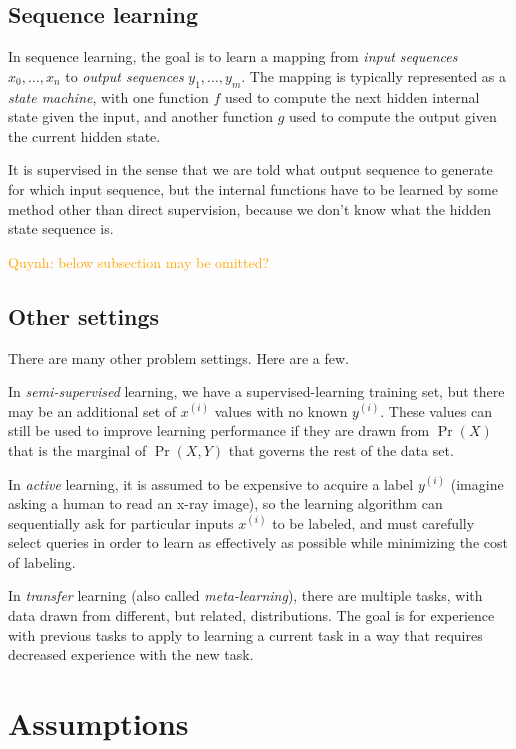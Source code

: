 \documentclass[11pt]{article}
\newcommand\ex[2]{#1^{(#2)}}
\newcommand{\qn}[1]{\textcolor{orange}{Quynh: #1}}
\begin{document}
\subsection{Sequence learning}

In sequence learning, the goal is to learn a mapping from {\em input
  sequences} $x_0, \ldots, x_n$ to {\em output sequences} $y_1,
\ldots, y_m$.  The mapping is typically represented as a {\em state
  machine}, with one function $f$ used to compute the next hidden
internal state given the input, and another function $g$ used to
compute the output given the current hidden state.  

It is supervised in the sense that we are told what output sequence to
generate for which input sequence, but the internal functions have to
be learned by some method other than direct supervision, because we
don't know what the hidden state sequence is.


\qn{below subsection may be omitted?}
\subsection{Other settings}
There are many other problem settings.  Here are a few.

In {\em semi-supervised} learning, we have a supervised-learning training set, but there may be an additional set of
$\ex{x}{i}$ values with no known $\ex{y}{i}$.  These values can still
be used to improve learning performance if they are drawn from
$\Pr(X)$ that is the marginal of $\Pr(X, Y)$ that governs the rest of
the data set.

In {\em active} learning, it is assumed to be expensive to acquire a
label $\ex{y}{i}$ (imagine asking a human to read an x-ray image), so 
the learning algorithm can sequentially ask for particular inputs
$\ex{x}{i}$ to be labeled, and must carefully select queries in order
to learn as effectively as possible while minimizing the cost of
labeling. 

In {\em transfer} learning (also called {\em meta-learning}), there
are multiple tasks, with data drawn 
from different, but related, distributions.  The goal is for
experience with previous tasks to apply to learning a current task in
a way that requires decreased experience with the new task.


\section{Assumptions}
\end{document}
